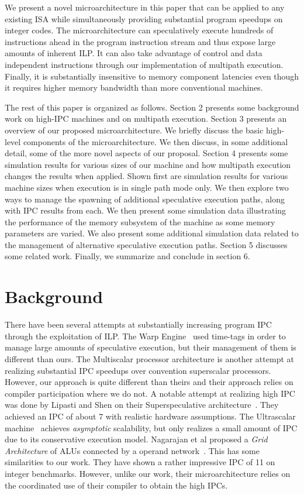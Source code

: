 \documentclass[10pt,dvips]{article}
\begin{document}
We present a novel microarchitecture in this paper that can
be applied to any existing ISA while simultaneously providing
substantial program speedups on integer codes.
The microarchitecture can speculatively execute hundreds
of instructions ahead in the program instruction stream and
thus expose large amounts of inherent ILP.
It can also take advantage of control
and data independent instructions through our implementation
of multipath execution.  Finally, it is substantially insensitive
to memory component latencies even though it requires higher
memory bandwidth than more conventional machines.

The rest of this paper is organized as follows.
Section 2 presents some background work on
high-IPC machines and on multipath execution.
Section 3 presents an overview of our proposed microarchitecture.
We briefly discuss the basic high-level components of the microarchitecture.
We then discuss, in some
additional detail, some of the more novel aspects of
our proposal.
Section 4 presents some simulation results for various
sizes of our machine and how multipath execution
changes the results when applied.  Shown first are simulation
results for various machine sizes when execution is in
single path mode only.  We then explore two ways to manage
the spawning of additional
speculative execution paths, along with IPC results from each.
We then present some simulation data illustrating
the performance of the memory subsystem of the machine as some
memory parameters are varied.
We also present some additional simulation data related
to the management of alternative speculative execution paths.
Section 5 discusses some related work.
Finally, we summarize and conclude in section 6.
%
\section{Background}
%
There have been several attempts at substantially increasing
program IPC through the exploitation of ILP.
The Warp Engine~\cite{Cle95}
used time-tags in order to manage large amounts of speculative execution,
but their management of them is different than ours.
The Multiscalar processor architecture \cite{Soh95}
is another attempt at
realizing substantial IPC speedups over convention superscalar
processors.  However, our approach is quite different than theirs
and their approach relies on compiler participation where we do not.
A notable attempt at realizing high IPC was done by
Lipasti and Shen on their Superspeculative
architecture~\cite{Lip97}.  They achieved an IPC of
about 7 with realistic hardware assumptions.
The Ultrascalar machine~\cite{Hen00}
achieves {\em asymptotic} scalability,
but only realizes a small amount of IPC due to its 
conservative execution model.
Nagarajan et al proposed a {\em Grid Architecture} of ALUs
connected by a operand network~\cite{Nag01}.  
This has some similarities to our work.
They have shown a rather impressive IPC of 11 on integer benchmarks.
However, unlike our work, their microarchitecture
relies on the coordinated use of their compiler to obtain the high IPCs.
\end{document}
